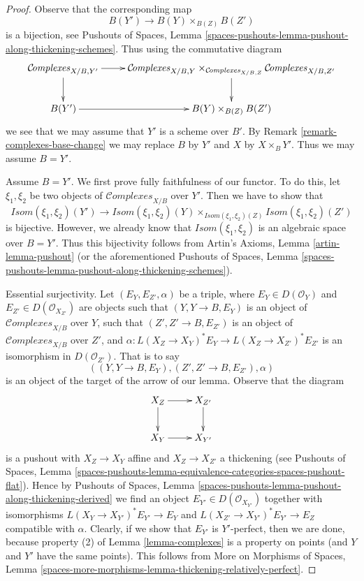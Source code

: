 \documentclass[10pt,a4paper]{amsart}
\theoremstyle{plain}
\theoremstyle{definition}
\theoremstyle{remark}
\numberwithin{equation}{subsection}
\def\Complexesstack{\mathcal{C}\!\mathit{omplexes}}
\begin{document}
\begin{proof}
Observe that the corresponding map
$$
B(Y') \longrightarrow B(Y) \times_{B(Z)} B(Z')
$$
is a bijection, see Pushouts of Spaces, Lemma
\ref{spaces-pushouts-lemma-pushout-along-thickening-schemes}.
Thus using the commutative diagram
$$
\xymatrix{
\Complexesstack_{X/B, Y'} \ar[r] \ar[d] &
\Complexesstack_{X/B, Y}
\times_{\Complexesstack_{X/B, Z}}
\Complexesstack_{X/B, Z'}
\ar[d] \\
B(Y') \ar[r] & B(Y) \times_{B(Z)} B(Z')
}
$$
we see that we may assume that $Y'$ is a scheme over $B'$. By
Remark \ref{remark-complexes-base-change}
we may replace $B$ by $Y'$ and $X$ by $X \times_B Y'$.
Thus we may assume $B = Y'$.

\medskip\noindent
Assume $B = Y'$. We first prove fully faithfulness of our functor.
To do this, let $\xi_1, \xi_2$ be two objects of $\Complexesstack_{X/B}$
over $Y'$. Then we have to show that
$$
\mathit{Isom}(\xi_1, \xi_2)(Y') \longrightarrow
\mathit{Isom}(\xi_1, \xi_2)(Y)
\times_{\mathit{Isom}(\xi_1, \xi_2)(Z)}
\mathit{Isom}(\xi_1, \xi_2)(Z')
$$
is bijective. However, we already know that $\mathit{Isom}(\xi_1, \xi_2)$
is an algebraic space over $B = Y'$. Thus this bijectivity follows from
Artin's Axioms, Lemma \ref{artin-lemma-pushout} (or the aforementioned
Pushouts of Spaces, Lemma
\ref{spaces-pushouts-lemma-pushout-along-thickening-schemes}).

\medskip\noindent
Essential surjectivity. Let $(E_Y, E_{Z'}, \alpha)$ be a triple,
where $E_Y \in D(\mathcal{O}_Y)$ and $E_{Z'} \in D(\mathcal{O}_{X_{Z'}})$
are objects such that $(Y, Y \to B, E_Y)$ is an object of
$\Complexesstack_{X/B}$ over $Y$, such that
$(Z', Z' \to B, E_{Z'})$ is an object of $\Complexesstack_{X/B}$ over $Z'$,
and $\alpha : L(X_Z \to X_Y)^*E_Y \to L(X_Z \to X_{Z'})^*E_{Z'}$
is an isomorphism in $D(\mathcal{O}_{Z'})$.
That is to say
$$
((Y, Y \to B, E_Y), (Z', Z' \to B, E_{Z'}), \alpha)
$$
is an object of the target of the arrow of our lemma.
Observe that the diagram
$$
\xymatrix{
X_Z \ar[r] \ar[d] & X_{Z'} \ar[d] \\
X_Y \ar[r] & X_{Y'}
}
$$
is a pushout with $X_Z \to X_Y$ affine and $X_Z \to X_{Z'}$ a thickening
(see Pushouts of Spaces, Lemma
\ref{spaces-pushouts-lemma-equivalence-categories-spaces-pushout-flat}).
Hence by Pushouts of Spaces, Lemma
\ref{spaces-pushouts-lemma-pushout-along-thickening-derived}
we find an object $E_{Y'} \in D(\mathcal{O}_{X_{Y'}})$
together with isomorphisms
$L(X_Y \to X_{Y'})^*E_{Y'} \to E_Y$ and
$L(X_{Z'} \to X_{Y'})^*E_{Y'} \to E_Z$
compatible with $\alpha$. Clearly, if we show that
$E_{Y'}$ is $Y'$-perfect, then we are done, because property (2)
of Lemma \ref{lemma-complexes}
is a property on points (and $Y$ and $Y'$ have the same points).
This follows from More on Morphisms of Spaces, Lemma
\ref{spaces-more-morphisms-lemma-thickening-relatively-perfect}.
\end{proof}
\end{document}
